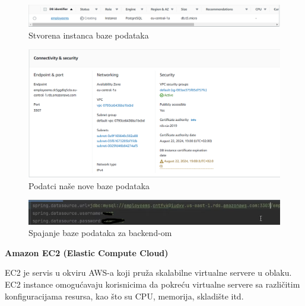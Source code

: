			\begin{figure}[H]
				\includegraphics[scale=0.5]{slike/Deploy1.PNG} %
				\centering
				\caption{Stvorena instanca baze podataka}
				\label{fig:promjene}
			\end{figure}
			
				\begin{figure}[H]
				\includegraphics[scale=0.5]{slike/Deploy2.PNG} %
				\centering
				\caption{Podatci naše nove baze podataka}
				\label{fig:promjene}
			\end{figure}
			
			\begin{figure}[H]
				\includegraphics[scale=1]{slike/Deploy3.PNG} %
				\centering
				\caption{Spajanje baze podataka za backend-om}
				\label{fig:promjene}
			\end{figure}
			
				\textbf{Amazon EC2  (Elastic Compute Cloud) }
			\newline
			
			EC2 je servis u okviru AWS-a koji pruža skalabilne virtualne servere u oblaku. EC2 instance omogućavaju korisnicima da pokreću virtualne servere sa različitim konfiguracijama resursa, kao što su CPU, memorija, skladište itd.
			
